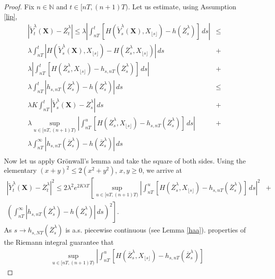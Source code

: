 \documentclass[a4paper,draft]{article}
\begin{document}
\begin{proof}
Fix $n\in\mathbb{N}$ and $t\in [nT,(n+1)T)$. Let us estimate, using Assumption \ref{lip},
\begin{eqnarray*}
\left|\tilde{Y}^{\lambda}_t(\mathbf{X})-\overline{Z}^{\lambda}_t\right|\leq \lambda \left\vert\int_{nT}^t
\left[H(\tilde{Y}^{\lambda}_s(\mathbf{X}),X_{\lfloor s\rfloor})-h(\overline{Z}^{\lambda}_s)\right]\, ds\right\vert
&\leq&\\
\lambda\int_{nT}^t
\left|H(\tilde{Y}^{\lambda}_s(\mathbf{X}),X_{\lfloor s\rfloor})-H(\overline{Z}^{\lambda}_s,
X_{\lfloor s\rfloor})\right|\, ds &+&\\
\lambda\left\vert\int_{nT}^t
\left[H(\overline{Z}^{\lambda}_s,X_{\lfloor s\rfloor})-h_{s,nT}(\overline{Z}^{\lambda}_s)\right]\, ds\right\vert
&+&\\
\lambda\int_{nT}^t
\left|h_{s,nT}(\overline{Z}^{\lambda}_s)-h(\overline{Z}^{\lambda}_s)\right|\, ds
&\leq&\\
\lambda K\int_{nT}^t
\left|\tilde{Y}^{\lambda}_s(\mathbf{X})-\overline{Z}^{\lambda}_s\right|\, ds
& +&\\
\lambda\sup_{u\in [nT,(n+1)T)}\left\vert\int_{nT}^u
\left[H(\overline{Z}^{\lambda}_s,X_{\lfloor s\rfloor})-h_{s,nT}(\overline{Z}^{\lambda}_s)\right]\, ds\right\vert
&+&\\
\lambda\int_{nT}^{\infty}
\left|h_{s,nT}(\overline{Z}^{\lambda}_s)-h(\overline{Z}^{\lambda}_s)\right|\, ds
& &\\
\end{eqnarray*}
Now let us apply Gr\"onwall's lemma and take the square of both sides.
Using the elementary $(x+y)^2\leq 2(x^{2}+y^{2})$, $x,y\geq 0$,
we arrive at
\begin{eqnarray}\nonumber
\left|\tilde{Y}^{\lambda}_t(\mathbf{X})-\overline{Z}^{\lambda}_t\right|^{2}
\leq 2\lambda^{2} e^{2 K\lambda T}
\left[\sup_{u\in [nT,(n+1)T)}\left\vert\int_{nT}^u
\left[H(\overline{Z}^{\lambda}_s,X_{\lfloor s\rfloor})-h_{s,nT}(\overline{Z}^{\lambda}_s)\right]
\, ds\right\vert^{2}\right.
&+&\\
\label{trafo}\left.
\left(\int_{nT}^{\infty}
\left|h_{s,nT}(\overline{Z}^{\lambda}_s)-h(\overline{Z}^{\lambda}_s)\right|\, ds\right)^{2}
\right].
\end{eqnarray}
As $s\to h_{s,NT}(\overline{Z}^{\lambda}_s)$ is a.s. piecewise continuous (see Lemma \ref{haa}).
properties of the Riemann integral guarantee that
\begin{eqnarray}\nonumber
\sup_{u\in [nT,(n+1)T)}\left\vert\int_{nT}^u
\left[H(\overline{Z}^{\lambda}_s,X_{\lfloor s\rfloor})-h_{s,nT}(\overline{Z}^{\lambda}_s)\right]

\end{eqnarray}
\end{proof}
\end{document}
